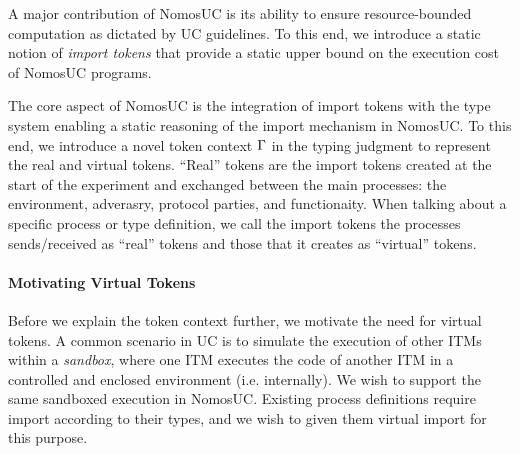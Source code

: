 A major contribution of NomosUC is its ability to ensure resource-bounded computation
as dictated by UC guidelines.
To this end, we introduce a static notion of \emph{import tokens} that provide a static upper
bound on the execution cost of NomosUC programs.

The core aspect of NomosUC is the integration of import tokens with the type system
enabling a static reasoning of the import mechanism in NomosUC.
To this end, we introduce a novel token context $\Gamma$ in the typing judgment to
represent the real and virtual tokens. ``Real'' tokens are the import tokens created
at the start of the experiment and exchanged between the main processes: the environment,
adverasry, protocol parties, and functionaity. When talking about a specific process 
or type definition, we call the import tokens the processes sends/received as ``real'' tokens
and those that it creates as ``virtual'' tokens.

\paragraph*{\textbf{Motivating Virtual Tokens}}
Before we explain the token context further, we motivate the need for virtual tokens.
A common scenario in UC is to simulate the execution of other ITMs within a \emph{sandbox},
where one ITM executes the code of another ITM in a controlled and enclosed environment (i.e. internally).
We wish to support the same sandboxed execution in NomosUC.
Existing process definitions require import according to their types, and we wish to given them
virtual import for this purpose.

